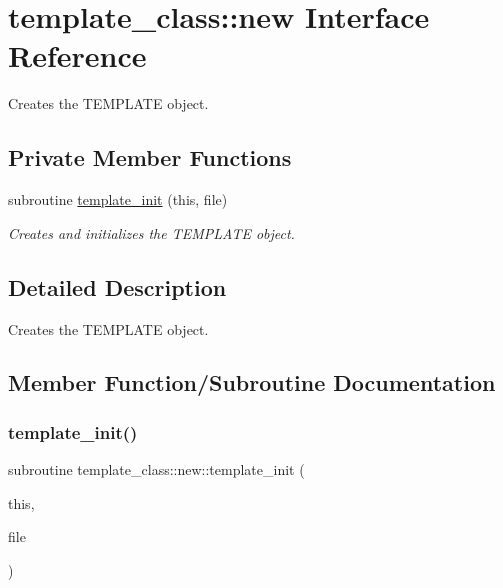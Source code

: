 \hypertarget{interfacetemplate__class_1_1new}{}\section{template\+\_\+class\+:\+:new Interface Reference}
\label{interfacetemplate__class_1_1new}


Creates the T\+E\+M\+P\+L\+A\+TE object.  


\subsection*{Private Member Functions}
\begin{DoxyCompactItemize}
\item 
subroutine \hyperlink{interfacetemplate__class_1_1new_ad4f56a340283b6f6248577881bf27865}{template\+\_\+init} (this, file)
\begin{DoxyCompactList}\small\item\em Creates and initializes the T\+E\+M\+P\+L\+A\+TE object. \end{DoxyCompactList}\end{DoxyCompactItemize}


\subsection{Detailed Description}
Creates the T\+E\+M\+P\+L\+A\+TE object. 

\subsection{Member Function/\+Subroutine Documentation}
\mbox{\label{interfacetemplate__class_1_1new_ad4f56a340283b6f6248577881bf27865}} 
\subsubsection{\texorpdfstring{template\+\_\+init()}{template\_init()}}
{\footnotesize\ttfamily subroutine template\+\_\+class\+::new\+::template\+\_\+init (\begin{DoxyParamCaption}\item[{type(\hyperlink{structtemplate__class_1_1template}{template}), intent(inout)}]{this,  }\item[{character$\ast$($\ast$), intent(in), optional}]{file }\end{DoxyParamCaption})\hspace{0.3cm}{\ttfamily [private]}}



